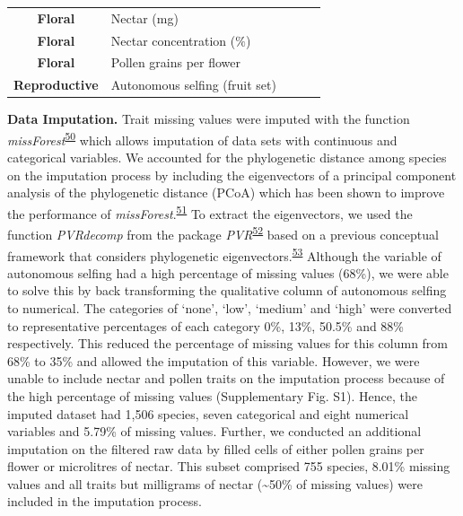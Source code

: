 \documentclass[
  12pt,
  a4paper,
]{article}
\begin{document}
\begin{table}
\begin{tabular}[t]{>{}cl>{}ccl}
\addlinespace
\textbf{Floral} & Nectar (mg) & \textbf{} &  & \\
\addlinespace
\textbf{Floral} & Nectar concentration ($\%$) & \textbf{} &  & \\
\addlinespace
\textbf{Floral} & Pollen grains per flower & \textbf{} &  & \\
\addlinespace
\textbf{Reproductive} & Autonomous selfing (fruit set) & \textbf{} &  & \\
\bottomrule
\end{tabular}
\end{table}

\doublespacing

\textbf{Data Imputation.} Trait missing values were imputed with the function \emph{missForest}\textsuperscript{\protect\hyperlink{ref-stekhoven2012}{50}} which allows imputation of data sets with continuous and categorical variables. We accounted for the phylogenetic distance among species on the imputation process by including the eigenvectors of a principal component analysis of the phylogenetic distance (PCoA) which has been shown to improve the performance of \emph{missForest}.\textsuperscript{\protect\hyperlink{ref-penone2014}{51}} To extract the eigenvectors, we used the function \emph{PVRdecomp} from the package \emph{PVR}\textsuperscript{\protect\hyperlink{ref-santos2018}{52}} based on a previous conceptual framework that considers phylogenetic eigenvectors.\textsuperscript{\protect\hyperlink{ref-diniz-filho2012}{53}} Although the variable of autonomous selfing had a high percentage of missing values (68\%), we were able to solve this by back transforming the qualitative column of autonomous selfing to numerical. The categories of `none', `low', `medium' and `high' were converted to representative percentages of each category 0\%, 13\%, 50.5\% and 88\% respectively. This reduced the percentage of missing values for this column from 68\% to 35\% and allowed the imputation of this variable. However, we were unable to include nectar and pollen traits on the imputation process because of the high percentage of missing values (Supplementary Fig. S1). Hence, the imputed dataset had 1,506 species, seven categorical and eight numerical variables and 5.79\% of missing values. Further, we conducted an additional imputation on the filtered raw data by filled cells of either pollen grains per flower or microlitres of nectar. This subset comprised 755 species, 8.01\% missing values and all traits but milligrams of nectar (\textasciitilde50\% of missing values) were included in the imputation process.
\end{document}
